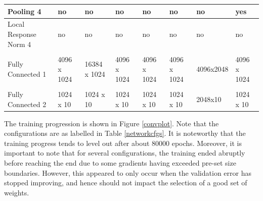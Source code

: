 \documentclass{article} %
\begin{document}
\begin{table}[h]
{\begin{tabular}{llllllll}
\multicolumn{1}{|l|}{Pooling 4}             & \multicolumn{1}{l|}{no}          & \multicolumn{1}{l|}{no}           & \multicolumn{1}{l|}{no}          & \multicolumn{1}{l|}{no}          & \multicolumn{1}{l|}{no}          & \multicolumn{1}{l|}{no}          & \multicolumn{1}{l|}{yes}         \\ \hline
\multicolumn{1}{|l|}{Local Response Norm 4} & \multicolumn{1}{l|}{no}          & \multicolumn{1}{l|}{no}           & \multicolumn{1}{l|}{no}          & \multicolumn{1}{l|}{no}          & \multicolumn{1}{l|}{no}          & \multicolumn{1}{l|}{no}          & \multicolumn{1}{l|}{no}          \\ \hline
                                            &                                  &                                   &                                  &                                  &                                  &                                  &                                  \\ \hline
\multicolumn{1}{|l|}{Fully Connected 1}     & \multicolumn{1}{l|}{4096 x 1024} & \multicolumn{1}{l|}{16384 x 1024} & \multicolumn{1}{l|}{4096 x 1024} & \multicolumn{1}{l|}{4096 x 1024} & \multicolumn{1}{l|}{4096 x 1024} & \multicolumn{1}{l|}{4096x2048}   & \multicolumn{1}{l|}{4096 x 1024} \\ \hline
                                            &                                  &                                   &                                  &                                  &                                  &                                  &                                  \\ \hline
\multicolumn{1}{|l|}{Fully Connected 2}     & \multicolumn{1}{l|}{1024 x 10}   & \multicolumn{1}{l|}{1024 x 10}    & \multicolumn{1}{l|}{1024 x 10}   & \multicolumn{1}{l|}{1024 x 10}   & \multicolumn{1}{l|}{1024 x 10}   & \multicolumn{1}{l|}{2048x10}     & \multicolumn{1}{l|}{1024 x 10}   \\ \hline
\end{tabular}}
\end{table}

The training progression is shown in Figure \ref{convplot}. Note that the configurations are as labelled in Table \ref{networkcfgs}. It is noteworthy that the training progress tends to level out after about 80000 epochs. Moreover, it is important to note that for several configurations, the training ended abruptly before reaching the end due to some gradients having exceeded pre-set size boundaries. However, this appeared to only occur when the validation error has stopped improving, and hence should not impact the selection of a good set of weights. 
\end{document}
